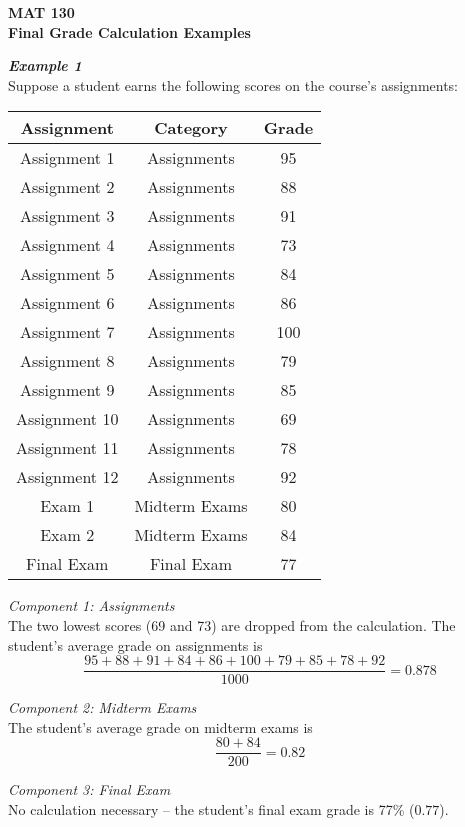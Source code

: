 \documentclass[12pt]{letter}
\author{Jacob Ayers}
\newcommand{\?}{\stackrel{?}{=}}
\begin{document}
	
	\begin{center}
		\textbf{MAT 130 \\ Final Grade Calculation Examples}
	\end{center}
	
	\textbf{\textit{Example 1}} \\
	Suppose a student earns the following scores on the course's assignments:
	
	\begin{tabular}{|c|c|c|} \hline
		\textbf{Assignment} & \textbf{Category} & \textbf{Grade} \\ \hline
		Assignment 1 & Assignments & 95 \\ \hline
		Assignment 2 & Assignments & 88 \\ \hline
		Assignment 3 & Assignments & 91 \\ \hline
		Assignment 4 & Assignments & 73 \\ \hline
		Assignment 5 & Assignments & 84 \\ \hline
		Assignment 6 & Assignments & 86 \\ \hline
		Assignment 7 & Assignments & 100 \\ \hline
		Assignment 8 & Assignments & 79 \\ \hline
		Assignment 9 & Assignments & 85 \\ \hline
		Assignment 10 & Assignments & 69 \\ \hline
		Assignment 11 & Assignments & 78 \\ \hline
		Assignment 12 & Assignments & 92 \\ \hline
		Exam 1 & Midterm Exams & 80 \\ \hline
		Exam 2 & Midterm Exams & 84 \\ \hline
		Final Exam & Final Exam & 77 \\ \hline
	\end{tabular}

	\textit{Component 1: Assignments} \\
	The two lowest scores (69 and 73) are dropped from the calculation. The student's average grade on assignments is $$\dfrac{95 + 88 + 91 + 84 + 86 + 100 + 79 + 85 + 78 + 92}{1000} = 0.878$$
	
	\textit{Component 2: Midterm Exams} \\
	The student's average grade on midterm exams is $$\dfrac{80 + 84}{200} = 0.82$$
	
	\textit{Component 3: Final Exam} \\
	No calculation necessary -- the student's final exam grade is 77\% ($0.77$).
	
\end{document}
